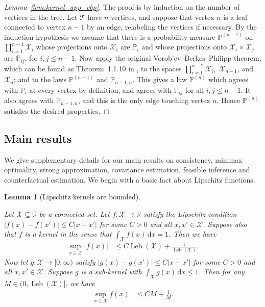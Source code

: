 \documentclass[11pt,lof]{puthesis}
\renewcommand{\P}{\ensuremath{\mathbb{P}}}
\newcommand{\R}{\ensuremath{\mathbb{R}}}
\newcommand{\cX}{\ensuremath{\mathcal{X}}}
\newcommand{\cT}{\ensuremath{\mathcal{T}}}
\DeclareMathOperator{\Leb}{Leb}
\newcommand{\diff}[1]{\,\mathrm{d}#1}
\theoremstyle{break}
\newtheorem{lemma}{Lemma}[section]
\theoremstyle{proof}
\newtheorem{proof}{Proof}
\begin{document}
\begin{proof}[Lemma~\ref{lem:kernel_app_vbp}]

  The proof is by induction on the number of vertices in the tree.
  Let $\cT$ have $n$ vertices,
  and suppose that vertex $n$ is a leaf
  connected to vertex $n-1$ by an edge,
  relabeling the vertices if necessary.
  By the induction hypothesis we assume that there is a
  probability measure $\P^{(n-1)}$
  on $\prod_{i=1}^{n-1} \cX_i$
  whose projections onto $\cX_i$ are $\P_i$
  and whose projections onto $\cX_i \times \cX_j$ are $\P_{i j}$,
  for $i,j \leq n-1$.
  Now apply the original
  Vorob'ev--Berkes--Philipp theorem,
  which can be found as Theorem~1.1.10 in
  \citet{dudley1999uniform},
  to the spaces
  $\prod_{i=1}^{n-2} \cX_i$,\,
  $\cX_{n-1}$, and
  $\cX_n$;
  and to the laws
  $\P^{(n-1)}$
  and $\P_{n-1, n}$.
  This gives a law $\P^{(n)}$
  which agrees with $\P_i$
  at every vertex by definition,
  and agrees with
  $\P_{i j}$ for all $i,j \leq n-1$.
  It also agrees with $\P_{n-1,n}$,
  and this is the only edge touching vertex $n$.
  Hence $\P^{(n)}$ satisfies the desired properties.
\end{proof}

\subsection{Main results}
\label{sec:kernel_app_main}

We give supplementary details for our main results on consistency, minimax
optimality, strong approximation, covariance estimation, feasible inference and
counterfactual estimation.
We begin with a basic fact about Lipschitz functions.

\begin{lemma}[Lipschitz kernels are bounded]
  \label{lem:kernel_app_lipschitz_kernels_bounded}

  Let $\cX \subseteq \R$ be a connected set.
  Let $f: \cX \to \R$ satisfy the Lipschitz condition
  $|f(x) - f(x')| \leq C |x-x'|$ for some $C > 0$
  and all $x, x' \in \cX$.
  Suppose also that $f$ is a kernel in the sense that
  $\int_\cX f(x) \diff{x} = 1$.
  Then we have
  \begin{align*}
    \sup_{x \in \cX} |f(x)|
    &\leq
    C \Leb(\cX) + \frac{1}{\Leb(\cX)}.
  \end{align*}
  Now let $g: \cX \to [0,\infty)$ satisfy
  $|g(x) - g(x')| \leq C |x-x'|$ for some $C > 0$
  and all $x, x' \in \cX$.
  Suppose $g$ is a sub-kernel with
  $\int_\cX g(x) \diff{x} \leq 1$.
  Then for any $M \in \big(0, \Leb(\cX)\big]$,
  we have
  \begin{align*}
    \sup_{x \in \cX} f(x)
    &\leq
    C M + \frac{1}{M}.
  \end{align*}

\end{lemma}
\end{document}
